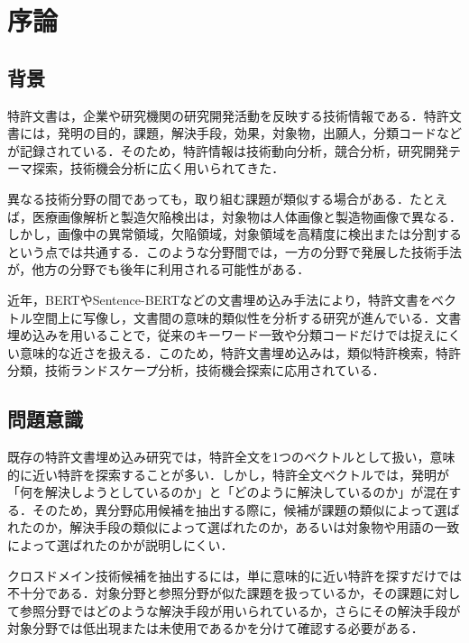 \chapter{序論}

\section{背景}
特許文書は，企業や研究機関の研究開発活動を反映する技術情報である．特許文書には，発明の目的，課題，解決手段，効果，対象物，出願人，分類コードなどが記録されている．そのため，特許情報は技術動向分析，競合分析，研究開発テーマ探索，技術機会分析に広く用いられてきた\cite{griliches1990patent, oecd2009patent}．

異なる技術分野の間であっても，取り組む課題が類似する場合がある．たとえば，医療画像解析と製造欠陥検出は，対象物は人体画像と製造物画像で異なる．しかし，画像中の異常領域，欠陥領域，対象領域を高精度に検出または分割するという点では共通する．このような分野間では，一方の分野で発展した技術手法が，他方の分野でも後年に利用される可能性がある．

近年，BERTやSentence-BERTなどの文書埋め込み手法により，特許文書をベクトル空間上に写像し，文書間の意味的類似性を分析する研究が進んでいる\cite{reimers2019sentencebert, bekamiri2021patentsberta}．文書埋め込みを用いることで，従来のキーワード一致や分類コードだけでは捉えにくい意味的な近さを扱える．このため，特許文書埋め込みは，類似特許検索，特許分類，技術ランドスケープ分析，技術機会探索に応用されている．

\section{問題意識}
既存の特許文書埋め込み研究では，特許全文を1つのベクトルとして扱い，意味的に近い特許を探索することが多い．しかし，特許全文ベクトルでは，発明が「何を解決しようとしているのか」と「どのように解決しているのか」が混在する．そのため，異分野応用候補を抽出する際に，候補が課題の類似によって選ばれたのか，解決手段の類似によって選ばれたのか，あるいは対象物や用語の一致によって選ばれたのかが説明しにくい．

クロスドメイン技術候補を抽出するには，単に意味的に近い特許を探すだけでは不十分である．対象分野と参照分野が似た課題を扱っているか，その課題に対して参照分野ではどのような解決手段が用いられているか，さらにその解決手段が対象分野では低出現または未使用であるかを分けて確認する必要がある．

